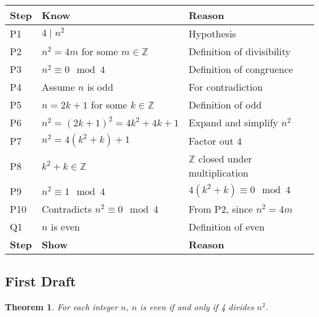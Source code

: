 \documentclass[12pt]{article}
\newtheorem*{theorem}{Theorem}
\theoremstyle{definition}
\begin{document}
\begin{center}
    \begin{tabular}{|p{}|p{}|p{}|}
    \hline
    \textbf{Step} & \textbf{Know} & \textbf{Reason} \\
    \hline
        P1 & \( 4 \mid n^2 \) & Hypothesis \\
    \hline
        P2 & \( n^2 = 4m \) for some \( m \in \mathbb{Z} \) & Definition of divisibility \\
    \hline
        P3 & \( n^2 \equiv 0 \mod 4 \) & Definition of congruence \\
    \hline
        P4 & Assume \( n \) is odd & For contradiction \\
    \hline
        P5 & \( n = 2k + 1 \) for some \( k \in \mathbb{Z} \) & Definition of odd \\
    \hline
        P6 & \( n^2 = (2k + 1)^2 = 4k^2 + 4k + 1 \) & Expand and simplify \( n^2 \) \\
    \hline
        P7 & \( n^2 = 4(k^2 + k) + 1 \) & Factor out 4 \\
    \hline
        P8 & \( k^2 + k \in \mathbb{Z} \) & \( \mathbb{Z}\) closed under multiplication \\
    \hline
        P9 & \( n^2 \equiv 1 \mod 4 \) & \( 4(k^2 + k) \equiv 0 \mod 4 \) \\
    \hline
        P10 & Contradicts \( n^2 \equiv 0 \mod 4 \) & From P2, since \( n^2 = 4m \) \\
    \hline
        Q1 & \( n \) is even & Definition of even \\
    \hline
    \textbf{Step} & \textbf{Show} & \textbf{Reason} \\
    \hline
    \end{tabular}
\end{center}

\newpage

\subsection{First Draft}


\begin{theorem}
    For each integer \( n \), \( n \) is even if and only if 4 divides \( n^2 \).
\end{theorem}

\end{document}
